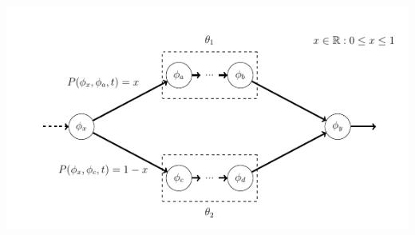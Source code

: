 \documentclass[13.5pt]{beamer}
\begin{document}
\begin{frame}[noframenumbering]
	
	\begin{center}
		\includegraphics[width=\textwidth,height=0.80\textheight]{../Images/super2.png}
	\end{center}
	
\end{frame} 


\end{document}
